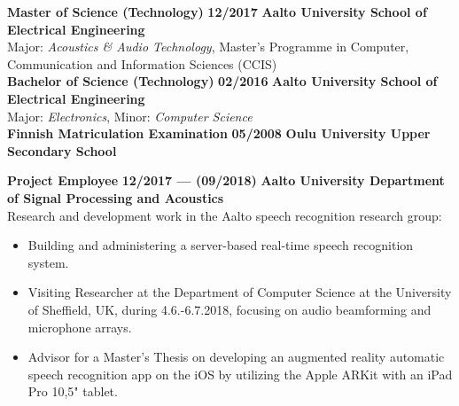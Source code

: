 \documentclass[8pt,a4paper,oneside]{article}
\newcommand{\myrule}{\vspace{0.5mm} {\color{lightgray}{\hrule height 0.5pt width \textwidth depth 0pt}} \vspace{1mm}}
\newcommand{\titledate}[2]{{\bfseries \color{textcolor}  \fontsize{12}{12}\selectfont #1} \hfill \textbf{#2} \myrule}
\newcommand{\workplace}[1]{{\bfseries \fontsize{11}{11}\selectfont #1}}
\newcommand{\sectitle}[1]{{\sc \bfseries \LARGE #1}}
\newcommand{\boxarc}{2.5mm}
\newcommand{\boxtop}{1.5mm}
\begin{document}
	\vspace{0.7mm} %
	
\begin{minipage}[t]{0.638\textwidth}
	
	
	\begin{tcolorbox}[top=1mm,bottom=1mm,right=1mm,left=1mm,arc=\boxarc,toptitle=\boxtop,bottomtitle=1mm,title=\sectitle{Education},box align=top]
	
	\titledate{Master of Science (Technology)}{12/2017}
	\workplace{Aalto University School of Electrical Engineering} \\
	Major: \textit{Acoustics \& Audio Technology}, Master's Programme in Computer, Communication and Information Sciences (CCIS) \\
	
	\titledate{Bachelor of Science (Technology)}{02/2016}
	\workplace{Aalto University School of Electrical Engineering} \\
	Major: \textit{Electronics}, Minor: \textit{Computer Science} \\
	
	\titledate{Finnish Matriculation Examination}{05/2008}
	\workplace{Oulu University Upper Secondary School}
	\end{tcolorbox} \vspace{\baselineskip}
	
	\begin{tcolorbox}[top=1mm,bottom=1mm,right=1mm,left=1mm,arc=\boxarc,toptitle=\boxtop,bottomtitle=1mm,title=\sectitle{Experience},box align=bottom]
		
	\titledate{Project Employee}{12/2017 --- (09/2018)}
	\workplace{Aalto University Department of Signal Processing and Acoustics} \\
	Research and development work in the Aalto speech recognition research group:
	\begin{itemize}[leftmargin=0.4cm, itemsep=0.5mm,parsep=0pt,topsep=0.5mm,label={\large\textbullet},before=\itshape]
		\small
		\item Building and administering a server-based real-time speech recognition system.
		\item Visiting Researcher at the Department of Computer Science at the University of Sheffield, UK, during 4.6.-6.7.2018, focusing on audio beamforming and microphone arrays.
		\item Advisor for a Master's Thesis on developing an augmented reality automatic speech recognition app on the iOS by utilizing the Apple ARKit with an iPad Pro 10,5" tablet. \\
	\end{itemize}
	

\end{tcolorbox}
\end{minipage}
\end{document}
